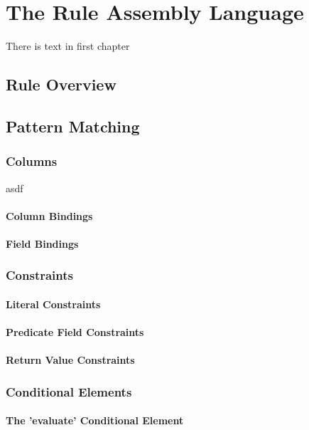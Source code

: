 \chapter{The Rule Assembly Language}
There is text in first chapter

\section{Rule Overview}

\section{Pattern Matching}

\subsection{Columns}
asdf
\subsubsection{Column Bindings}
\subsubsection{Field Bindings}
                                       
\subsection{Constraints}
\subsubsection{Literal Constraints}
\subsubsection{Predicate Field Constraints}
\subsubsection{Return Value Constraints}

\subsection{Conditional Elements}
\subsubsection{The 'evaluate' Conditional Element}
